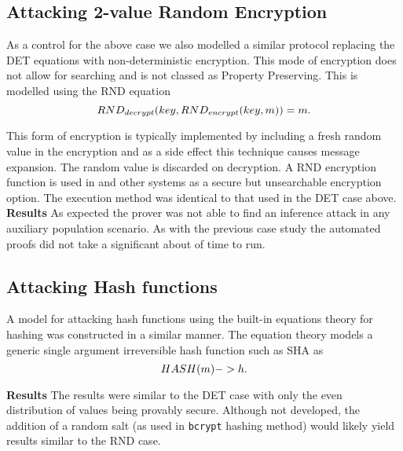 \documentclass[runningheads]{llncs}
\begin{document}
\subsection{Attacking 2-value Random Encryption}
As a control for the above case we also modelled a similar protocol replacing the DET equations with non-deterministic encryption.
This mode of encryption does not allow for searching and is not classed as Property Preserving. This is modelled using the RND equation\\ 

\begin{equation}
    RND_{decrypt}(key, RND_{encrypt}(key, m))=m.\\
\end{equation}

This form of encryption is typically implemented by including a fresh random value in the encryption and as a side effect this technique causes message expansion. The random value is discarded on decryption. A RND encryption function is used in \cite{Popa2011} and other systems as a secure but unsearchable encryption option.
The execution method was identical to that used in the DET case above.
\textbf{Results} As expected the prover was not able to find an inference attack in any auxiliary population scenario. As with the previous case study the automated proofs did not take a significant about of time to run.

\subsection{Attacking Hash functions}
A model for attacking hash functions using the built-in equations theory for hashing was constructed in a similar manner. The equation theory models a generic single argument irreversible hash function such as SHA as \\
\begin{equation}
    HASH(m) -> h.\\
\end{equation}

\textbf{Results} The results were similar to the DET case with only the even distribution of values being provably secure. Although not developed, the addition of a random salt (as used in \texttt{bcrypt} hashing method) would likely yield results similar to the RND case. 
\end{document}
